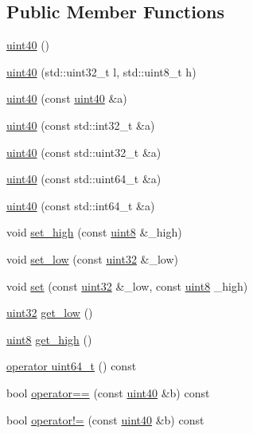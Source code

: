 \subsection*{Public Member Functions}
\begin{DoxyCompactItemize}
\item 
\hyperlink{classuint40_a457b73a04d5f5b2833155af392aaac96}{uint40} ()
\item 
\hyperlink{classuint40_a06f45dcc09d7533278c5fefbf7085440}{uint40} (std\+::uint32\+\_\+t l, std\+::uint8\+\_\+t h)
\item 
\hyperlink{classuint40_ab359a2f13e4d14944ae6ba3245d71ef3}{uint40} (const \hyperlink{classuint40}{uint40} \&a)
\item 
\hyperlink{classuint40_ad4165899ffb9045026ba833e5b8bc347}{uint40} (const std\+::int32\+\_\+t \&a)
\item 
\hyperlink{classuint40_a18e730effdedf9cba7e5524e9aef2778}{uint40} (const std\+::uint32\+\_\+t \&a)
\item 
\hyperlink{classuint40_afde52c521f80c8d54ff9bf600fa12aee}{uint40} (const std\+::uint64\+\_\+t \&a)
\item 
\hyperlink{classuint40_a39ca6ed5905712c2fc9f0f8eefc16989}{uint40} (const std\+::int64\+\_\+t \&a)
\item 
void \hyperlink{classuint40_a4d8e0bfd4cb5f959d89d3966c10a28bc}{set\+\_\+high} (const \hyperlink{types_8h_a115946cb5fc5879545e9ccea096a6031}{uint8} \&\+\_\+high)
\item 
void \hyperlink{classuint40_a451e74374aa8f180e94d341e18352d4c}{set\+\_\+low} (const \hyperlink{types_8h_a8f95e75e58492e87412191fabadd8ca8}{uint32} \&\+\_\+low)
\item 
void \hyperlink{classuint40_ab23ea17f6248ac0e7dbacbb71a96179b}{set} (const \hyperlink{types_8h_a8f95e75e58492e87412191fabadd8ca8}{uint32} \&\+\_\+low, const \hyperlink{types_8h_a115946cb5fc5879545e9ccea096a6031}{uint8} \+\_\+high)
\item 
\hyperlink{types_8h_a8f95e75e58492e87412191fabadd8ca8}{uint32} \hyperlink{classuint40_a0037fdf484bb069add9d9ee8c65dbc17}{get\+\_\+low} ()
\item 
\hyperlink{types_8h_a115946cb5fc5879545e9ccea096a6031}{uint8} \hyperlink{classuint40_ac08ecc53d6ae5d245218a768c3ac105c}{get\+\_\+high} ()
\item 
\hyperlink{classuint40_afca52041b179c0002070c33e7dd101a9}{operator uint64\+\_\+t} () const
\item 
bool \hyperlink{classuint40_afa6fa84dfd61e527efa6e4457abc2d81}{operator==} (const \hyperlink{classuint40}{uint40} \&b) const
\item 
bool \hyperlink{classuint40_af17f2004231903079eb4e36b64c96180}{operator!=} (const \hyperlink{classuint40}{uint40} \&b) const
\end{DoxyCompactItemize}
